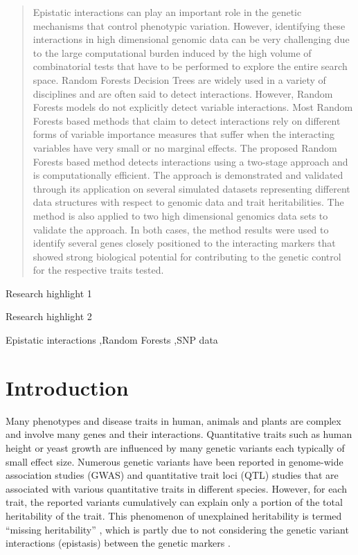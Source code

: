 \documentclass[preprint,12pt,3p]{elsarticle}
\begin{document}
\begin{frontmatter}
\begin{abstract}
Epistatic interactions can play an important role in the genetic mechanisms that control phenotypic
  variation. However, identifying these interactions in high dimensional genomic data can be very challenging due to the
  large computational burden induced by the high volume of combinatorial tests that have to be performed to explore the
  entire search space.  Random Forests Decision Trees are widely used in a variety of disciplines and are often said to
  detect interactions.  However, Random Forests models do not explicitly detect variable interactions. Most Random
  Forests based methods that claim to detect interactions rely on different forms of variable importance measures that
  suffer when the interacting variables have very small or no marginal effects. The proposed Random Forests based method
  detects interactions using a two-stage approach and is computationally efficient. The approach is demonstrated and
  validated through its application on several simulated datasets representing different data structures with respect to
  genomic data and trait heritabilities. The method is also applied to two high dimensional genomics data sets to
  validate the approach. In both cases, the method results were used to identify several genes closely positioned to the
  interacting markers that showed strong biological potential for contributing to the genetic control for the respective
  traits tested.
\end{abstract}

\begin{highlights}
\item Research highlight 1
\item Research highlight 2
\end{highlights}

\begin{keyword}
Epistatic interactions \sep  Random Forests \sep SNP data
\end{keyword}

\end{frontmatter}


\linenumbers
\section{Introduction}
Many phenotypes and disease traits in human, animals and plants are complex and involve many genes and their
interactions.  Quantitative traits such as human height or yeast growth are influenced by many genetic variants each
typically of small effect size.  Numerous genetic variants have been reported in genome-wide association studies (GWAS)
and quantitative trait loci (QTL) studies that are associated with various quantitative traits in different
species. However, for each trait, the reported variants cumulatively can explain only a portion of the total
heritability of the trait.  This phenomenon of unexplained heritability is termed ``missing heritability''
\cite[]{Maher2008}, which is partly due to not considering the genetic variant interactions (epistasis) between the
genetic markers \cite[]{Zuk.et.al.2012}.
\end{document}

